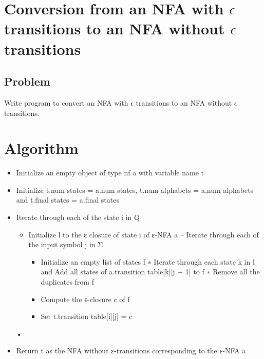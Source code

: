 \documentclass[a4paper, 12pt]{report}
\begin{document}
    \section{Conversion from an NFA with $\epsilon$ transitions to an NFA 
    without $\epsilon$ transitions}
    
    \subsection{Problem}
    Write program to convert an NFA with $\epsilon$ transitions to an NFA 
    without $\epsilon$ transitions.
    \section{Algorithm}
    \begin{itemize}
        \item{Initialize an empty object of type nf a with variable name t}
        \item{Initialize t.num states = a.num states, t.num alphabets = a.num alphabets
and t.final states = a.final states}
        \item{Iterate through each of the state i in Q
        \begin{itemize}
            \item {Initialize l to the ε closure of state i of ε-NFA a – Iterate through each of the input symbol j in Σ}
                \begin{itemize}
                    \item {Initialize an empty list of states f ∗ Iterate through each state k in l and Add all states of a.transition table[k][j + 1] to f ∗ Remove all the duplicates from f}
                    \item {Compute the ε-closure c of f}
                    \item {Set t.transition table[i][j] = c}
                \end{itemize}
        \end{itemize}}
• \item{Return t as the NFA without ε-transitions corresponding to the ε-NFA a}
    \end{itemize}
\end{document}
